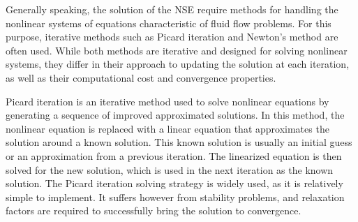
Generally speaking, the solution of the \Gls{NSE} require methods for handling the nonlinear systems of equations characteristic of fluid flow problems. For this purpose, iterative methods such as Picard iteration and Newton's method are often used. While both methods are iterative and designed for solving nonlinear systems, they differ in their approach to updating the solution at each iteration, as well as their computational cost and convergence properties.

Picard iteration is an iterative method used to solve nonlinear equations by generating a sequence of improved approximated solutions. In this method, the nonlinear equation is replaced with a linear equation that approximates the solution around a known solution. This known solution is usually an initial guess or an approximation from a previous iteration. The linearized equation is then solved for the new solution, which is used in the next iteration as the known solution. The Picard iteration solving strategy is widely used, as it is relatively simple to implement. It suffers however from stability problems, and relaxation factors are required to successfully bring the solution to convergence. 

